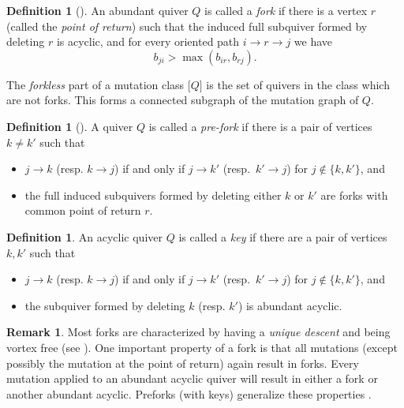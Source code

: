 \documentclass[11pt, letterpaper]{amsart}
\theoremstyle{definition}
\newtheorem{remark}[theorem]{Remark}
\newtheorem{definition}[theorem]{Definition}
\numberwithin{equation}{section}
\begin{document}
\begin{definition}[{\cite[Definition~2.1]{warkentin2014exchange}}]
\label{def:forks}
An abundant quiver $Q$ is called a \emph{fork} if there is a vertex $r$ (called the \emph{point of return}) such that the induced full subquiver formed by deleting $r$ is acyclic, and for every oriented path $i \rightarrow r \rightarrow j$ we have $$b_{ji} > \max(b_{ir}, b_{rj}).$$

The \emph{forkless} part of a mutation class $\big [Q\big ]$ is the set of quivers in the class which are not forks. 
This forms a connected subgraph of the mutation graph of $Q$.
\end{definition}


\begin{definition}[{\cite[Definition~3.7]{warkentin2014exchange}}]
A quiver $Q$ is called a \emph{pre-fork} if there is a pair of vertices $k\neq k'$ such that 
\begin{itemize}
    \item $j \rightarrow k$ (resp. $k \rightarrow j$) if and only if $j \rightarrow k'$ (resp.\, $k' \rightarrow j$) for $j \not \in \{k, k'\}$, and
    \item the full induced subquivers formed by deleting either $k$ or $k'$ are forks with common point of return $r$.
\end{itemize}
\end{definition}

\begin{definition}
\label{def:key}
An acyclic quiver $Q$ is called a \emph{key} if there are a pair of vertices $k, k'$ such that 
\begin{itemize}
\item $j \rightarrow k$ (resp. $k \rightarrow j$) if and only if $j \rightarrow k'$ (resp.\, $k' \rightarrow j$) for $j \not \in \{k, k'\}$, and 
\item the subquiver formed by deleting $k$ (resp. $k'$) is abundant acyclic.
\end{itemize}
\end{definition}

\begin{remark}
Most forks are characterized by having a \emph{unique descent} and being vortex free (see \cite[Section 6]{LMC}).
One important property of a fork is that all mutations (except possibly the mutation at the point of return) again result in forks.
Every mutation applied to an abundant acyclic quiver will result in either a fork or another abundant acyclic.
Preforks (with keys) generalize these properties \cite{MR4695532}.
\end{remark}
\end{document}
